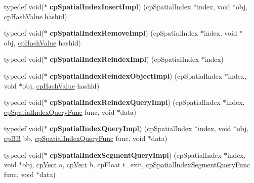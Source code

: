 \begin{DoxyCompactItemize}
typedef void($\ast$ {\bfseries cp\+Spatial\+Index\+Insert\+Impl}) (cp\+Spatial\+Index $\ast$index, void $\ast$obj, \hyperlink{group__basicTypes_gae7eb4775a9f43914a15553ca65a048f4}{cp\+Hash\+Value} hashid)
\item 
\mbox{\label{group__cpSpatialIndex_gaf943dffbd088c1f4809a254b0eb96860}} 
typedef void($\ast$ {\bfseries cp\+Spatial\+Index\+Remove\+Impl}) (cp\+Spatial\+Index $\ast$index, void $\ast$obj, \hyperlink{group__basicTypes_gae7eb4775a9f43914a15553ca65a048f4}{cp\+Hash\+Value} hashid)
\item 
\mbox{\label{group__cpSpatialIndex_gae8c6986404106d1b4717ef0a24463fe2}} 
typedef void($\ast$ {\bfseries cp\+Spatial\+Index\+Reindex\+Impl}) (cp\+Spatial\+Index $\ast$index)
\item 
\mbox{\label{group__cpSpatialIndex_ga5109ec90ae7c99cf421d1b233db63900}} 
typedef void($\ast$ {\bfseries cp\+Spatial\+Index\+Reindex\+Object\+Impl}) (cp\+Spatial\+Index $\ast$index, void $\ast$obj, \hyperlink{group__basicTypes_gae7eb4775a9f43914a15553ca65a048f4}{cp\+Hash\+Value} hashid)
\item 
\mbox{\label{group__cpSpatialIndex_gad1b5f2682c09f5f4e5e48f751e8e25b6}} 
typedef void($\ast$ {\bfseries cp\+Spatial\+Index\+Reindex\+Query\+Impl}) (cp\+Spatial\+Index $\ast$index, \hyperlink{group__cpSpatialIndex_ga7bcf80d017b29d32d9f8011405b241f9}{cp\+Spatial\+Index\+Query\+Func} func, void $\ast$data)
\item 
\mbox{\label{group__cpSpatialIndex_ga15683b78b71535766a2e69d203196549}} 
typedef void($\ast$ {\bfseries cp\+Spatial\+Index\+Query\+Impl}) (cp\+Spatial\+Index $\ast$index, void $\ast$obj, \hyperlink{structcpBB}{cp\+BB} bb, \hyperlink{group__cpSpatialIndex_ga7bcf80d017b29d32d9f8011405b241f9}{cp\+Spatial\+Index\+Query\+Func} func, void $\ast$data)
\item 
\mbox{\label{group__cpSpatialIndex_gab91c6534f37f1a493c58934417b16f09}} 
typedef void($\ast$ {\bfseries cp\+Spatial\+Index\+Segment\+Query\+Impl}) (cp\+Spatial\+Index $\ast$index, void $\ast$obj, \hyperlink{structcpVect}{cp\+Vect} a, \hyperlink{structcpVect}{cp\+Vect} b, cp\+Float t\+\_\+exit, \hyperlink{group__cpSpatialIndex_ga829ef5f6fd840ea31370d53db9045373}{cp\+Spatial\+Index\+Segment\+Query\+Func} func, void $\ast$data)
\end{DoxyCompactItemize}
